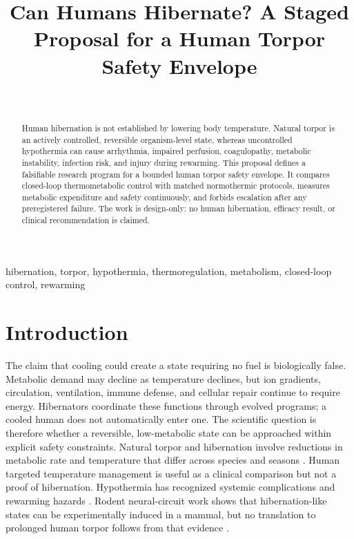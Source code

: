\documentclass[conference]{IEEEtran}
\begin{document}
\title{Can Humans Hibernate? A Staged Proposal for a Human Torpor Safety Envelope}
\author{\\}
\maketitle
\begin{abstract}Human hibernation is not established by lowering body temperature. Natural torpor is an actively controlled, reversible organism-level state, whereas uncontrolled hypothermia can cause arrhythmia, impaired perfusion, coagulopathy, metabolic instability, infection risk, and injury during rewarming. This proposal defines a falsifiable research program for a bounded human torpor safety envelope. It compares closed-loop thermometabolic control with matched normothermic protocols, measures metabolic expenditure and safety continuously, and forbids escalation after any preregistered failure. The work is design-only: no human hibernation, efficacy result, or clinical recommendation is claimed.\end{abstract}
\begin{IEEEkeywords}hibernation, torpor, hypothermia, thermoregulation, metabolism, closed-loop control, rewarming\end{IEEEkeywords}
\section{Introduction}
The claim that cooling could create a state requiring no fuel is biologically false. Metabolic demand may decline as temperature declines, but ion gradients, circulation, ventilation, immune defense, and cellular repair continue to require energy. Hibernators coordinate these functions through evolved programs; a cooled human does not automatically enter one. The scientific question is therefore whether a reversible, low-metabolic state can be approached within explicit safety constraints.
Natural torpor and hibernation involve reductions in metabolic rate and temperature that differ across species and seasons \cite{geiser2004,ruf2015}. Human targeted temperature management is useful as a clinical comparison but not a proof of hibernation. Hypothermia has recognized systemic complications and rewarming hazards \cite{polderman2009,nielsen2013}. Rodent neural-circuit work shows that hibernation-like states can be experimentally induced in a mammal, but no translation to prolonged human torpor follows from that evidence \cite{takahashi2020}.
\end{document}
